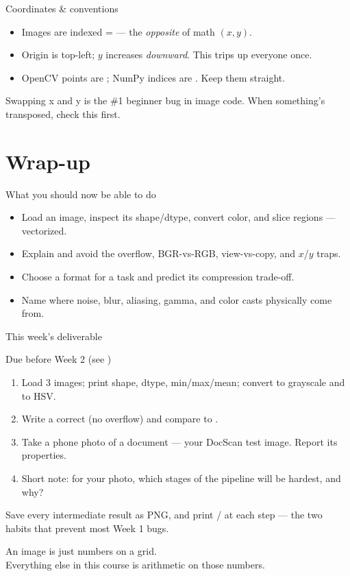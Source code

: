 \documentclass[10pt,aspectratio=169]{beamer}
\begin{document}
\begin{frame}{Coordinates \& conventions}
  \begin{itemize}
    \item Images are indexed  = \code{[y, x]} — the \emph{opposite} of math $(x,y)$.
    \item Origin is top-left; $y$ increases \emph{downward}. This trips up everyone once.
    \item OpenCV points are ; NumPy indices are \code{[y, x]}. Keep them straight.
  \end{itemize}
  \begin{badbox}
    Swapping x and y is the \#1 beginner bug in image code. When something's transposed, check this first.
  \end{badbox}
\end{frame}

\section{Wrap-up}

\begin{frame}{What you should now be able to do}
  \begin{itemize}
    \item Load an image, inspect its shape/dtype, convert color, and slice regions — vectorized.
    \item Explain and avoid the  overflow, BGR-vs-RGB, view-vs-copy, and $x$/$y$ traps.
    \item Choose a format for a task and predict its compression trade-off.
    \item Name where noise, blur, aliasing, gamma, and color casts physically come from.
  \end{itemize}
\end{frame}

\begin{frame}{This week's deliverable}
  \begin{alertblock}{Due before Week 2 (see )}
    \begin{enumerate}
      \item Load 3 images; print shape, dtype, min/max/mean; convert to grayscale and to HSV.
      \item Write a correct  (no overflow) and compare to .
      \item Take a phone photo of a document — your DocScan test image. Report its properties.
      \item Short note: for your photo, which stages of the pipeline will be hardest, and why?
    \end{enumerate}
  \end{alertblock}
  \begin{goodbox}
    Save every intermediate result as PNG, and print / at each step — the two habits that prevent most Week 1 bugs.
  \end{goodbox}
\end{frame}

\begin{frame}[standout]
  An image is just numbers on a grid.\\[4pt]
  \normalsize Everything else in this course is arithmetic on those numbers.
\end{frame}
\end{document}
